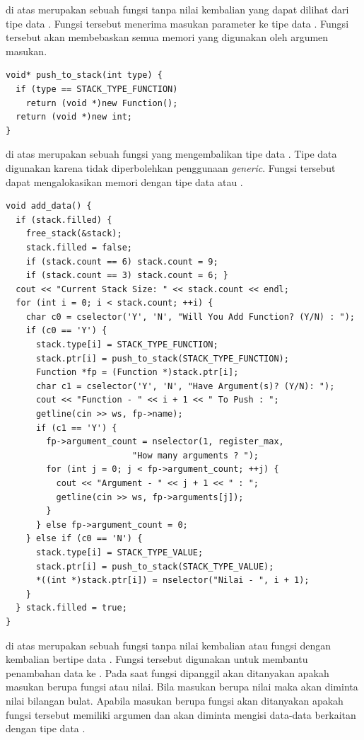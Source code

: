 \documentclass[../main.tex]{subfiles}
\begin{document}
{\Script} di atas merupakan sebuah fungsi tanpa nilai kembalian yang dapat dilihat dari tipe data . Fungsi tersebut menerima masukan parameter {\pointer} ke tipe data . Fungsi tersebut akan membebaskan semua memori yang digunakan oleh argumen masukan.

\begin{code}
\begin{verbatim}
void* push_to_stack(int type) {
  if (type == STACK_TYPE_FUNCTION)
    return (void *)new Function();
  return (void *)new int;
}
\end{verbatim}
\end{code}

{\Script} di atas merupakan sebuah fungsi yang mengembalikan tipe data . Tipe data  digunakan karena tidak diperbolehkan penggunaan \textit{generic}. Fungsi tersebut dapat mengalokasikan memori dengan tipe data  atau .

\begin{code}
\begin{verbatim}
void add_data() {
  if (stack.filled) {
    free_stack(&stack);
    stack.filled = false;
    if (stack.count == 6) stack.count = 9;
    if (stack.count == 3) stack.count = 6; }
  cout << "Current Stack Size: " << stack.count << endl;
  for (int i = 0; i < stack.count; ++i) {
    char c0 = cselector('Y', 'N', "Will You Add Function? (Y/N) : ");
    if (c0 == 'Y') {
      stack.type[i] = STACK_TYPE_FUNCTION;
      stack.ptr[i] = push_to_stack(STACK_TYPE_FUNCTION);
      Function *fp = (Function *)stack.ptr[i];
      char c1 = cselector('Y', 'N', "Have Argument(s)? (Y/N): ");
      cout << "Function - " << i + 1 << " To Push : ";
      getline(cin >> ws, fp->name);
      if (c1 == 'Y') {
        fp->argument_count = nselector(1, register_max,
                         "How many arguments ? ");
        for (int j = 0; j < fp->argument_count; ++j) {
          cout << "Argument - " << j + 1 << " : ";
          getline(cin >> ws, fp->arguments[j]);
        }
      } else fp->argument_count = 0;
    } else if (c0 == 'N') {
      stack.type[i] = STACK_TYPE_VALUE;
      stack.ptr[i] = push_to_stack(STACK_TYPE_VALUE);
      *((int *)stack.ptr[i]) = nselector("Nilai - ", i + 1);
    }
  } stack.filled = true;
}
\end{verbatim}
\end{code}

{\Script} di atas merupakan sebuah fungsi tanpa nilai kembalian atau fungsi dengan kembalian bertipe data . Fungsi tersebut digunakan untuk membantu penambahan data ke . Pada saat fungsi dipanggil akan ditanyakan apakah masukan berupa fungsi atau nilai. Bila masukan berupa nilai maka akan diminta nilai bilangan bulat. Apabila masukan berupa fungsi akan ditanyakan apakah fungsi tersebut memiliki argumen dan akan diminta mengisi data-data berkaitan dengan tipe data .
\end{document}
